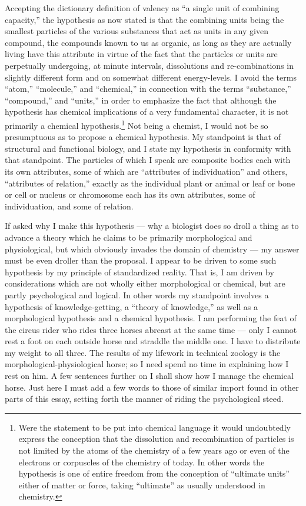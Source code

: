 \documentclass[a4paper, 11pt, oneside, polutonikogreek, english, landscape]{article}
\begin{document}
Accepting the dictionary definition of valency as ``a single unit of combining capacity,'' the hypothesis as now stated is that the combining units being the smallest particles of the various substances that act as units in any given compound, the compounds known to us as organic, as long as they are actually living have this attribute in virtue of the fact that the particles or units are perpetually undergoing, at minute intervals, dissolutions and re-combinations in slightly different form and on somewhat different energy-levels. I avoid the terms ``atom,'' ``molecule,'' and ``chemical,'' in connection with the terms ``substance,'' ``compound,'' and ``units,'' in order to emphasize the fact that although the hypothesis has chemical implications of a very fundamental character, it is not primarily a chemical hypothesis.\footnote{Were the statement to be put into chemical language it would undoubtedly express the conception that the dissolution and recombination of particles is not limited by the atoms of the chemistry of a few years ago or even of the electrons or corpuscles of the chemistry of today. In other words the hypothesis is one of entire freedom from the conception of ``ultimate units'' either of matter or force, taking ``ultimate'' as usually understood in chemistry.} Not being a chemist, I would not be so presumptuous as to propose a chemical hypothesis. My standpoint is that of structural and functional biology, and I state my hypothesis in conformity with that standpoint. The particles of which I speak are composite bodies each with its own attributes, some of which are ``attributes of individuation'' and others, ``attributes of relation,'' exactly as the individual plant or animal or leaf or bone or cell or nucleus or chromosome each has its own attributes, some of individuation, and some of relation.

If asked why I make this hypothesis --- why a biologist does so droll a thing as to advance a theory which he claims to be primarily morphological and physiological, but which obviously invades the domain of chemistry --- my answer must be even droller than the proposal. I appear to be driven to some such hypothesis by my principle of standardized reality. That is, I am driven by considerations which are not wholly either morphological or chemical, but are partly psychological and logical. In other words my standpoint involves a hypothesis of knowledge-getting, a ``theory of knowledge,'' as well as a morphological hypothesis and a chemical hypothesis. I am performing the feat of the circus rider who rides three horses abreast at the same time --- only I cannot rest a foot on each outside horse and straddle the middle one. I have to distribute my weight to all three. The results of my lifework in technical zoology is the morphological-physiological horse; so I need spend no time in explaining how I rest on him. A few sentences further on I shall show how I manage the chemical horse. Just here I must add a few words to those of similar import found in other parts of this essay, setting forth the manner of riding the psychological steed.
\end{document}
